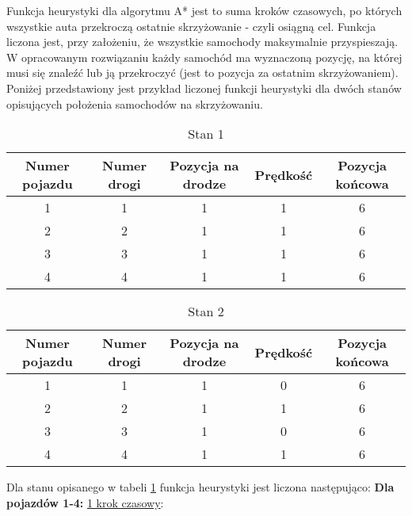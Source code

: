 Funkcja heurystyki dla algorytmu A* jest to suma kroków czasowych, po których wszystkie auta przekroczą ostatnie skrzyżowanie - czyli osiągną cel. Funkcja liczona jest, przy założeniu, że wszystkie samochody maksymalnie przyspieszają.
\newline
\indent
W opracowanym rozwiązaniu każdy samochód ma wyznaczoną pozycję, na której musi się znaleźć lub ją przekroczyć (jest to pozycja za ostatnim skrzyżowaniem). Poniżej przedstawiony jest przykład liczonej funkcji heurystyki dla dwóch stanów opisujących położenia samochodów na skrzyżowaniu.
\newline
\newline
\begin{table}[t]
    \begin{tabular}{|c|c|c|c|c|}
      \hline 
      Numer pojazdu & Numer drogi & Pozycja na drodze & Prędkość & Pozycja końcowa\\
      \hline
      1 & 1 & 1 & 1 & 6 \\
      \hline
      2 & 2 & 1 & 1 & 6 \\
      \hline
      3 & 3 & 1 & 1 & 6 \\
      \hline
      4 & 4 & 1 & 1 & 6 \\
      \hline
    \end{tabular} 
    \caption{Stan 1}
    \label{FirstState}
\end{table}
\newline
\begin{table}[t]
    \begin{tabular}{|c|c|c|c|c|}
      \hline 
      Numer pojazdu & Numer drogi & Pozycja na drodze & Prędkość & Pozycja końcowa\\
      \hline
      1 & 1 & 1 & 0 & 6 \\
      \hline
      2 & 2 & 1 & 1 & 6 \\
      \hline
      3 & 3 & 1 & 0 & 6 \\
      \hline
      4 & 4 & 1 & 1 & 6 \\
      \hline
    \end{tabular} 
    \caption{Stan 2}
    \label{SecondState}
\end{table}
\newpage
Dla stanu opisanego w tabeli \ref{FirstState} funkcja heurystyki jest liczona następująco:
\newline
\newline
\textbf{Dla pojazdów 1-4:}
\newline
\newline
\underline{1 krok czasowy}:
\newline
